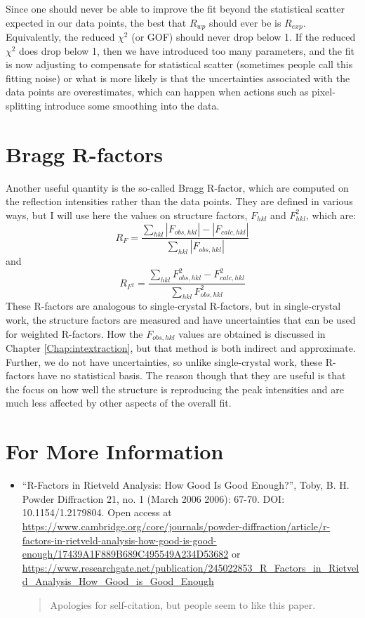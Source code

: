 Since one should never be able to improve the fit beyond the statistical scatter expected in our data points, the best that $R_{wp}$ should ever be is $R_{exp}$. Equivalently, the reduced $\chi^2$ (or GOF) should never drop below 1. If the reduced  $\chi^2$ does drop below 1, then we have introduced too many parameters, and the fit is now adjusting to compensate for statistical scatter (sometimes people call this fitting noise) or what is more likely is that the uncertainties associated with the data points are overestimates, which can happen when actions such as pixel-splitting introduce some smoothing into the data.  

\section{Bragg R-factors}

Another useful quantity  is the so-called Bragg R-factor, which are computed on the reflection intensities rather than the data points. They are defined in various ways, but I will use here the values on structure factors,  $F_{hkl}$ and $F_{hkl}^2$,  which are:
$$R_F  = \frac{\sum_{hkl} |F_{obs, hkl}| - |F_{calc, hkl}| } {\sum_{hkl} |F_{obs, hkl}|} $$
and 
$$R_{F^2}  = \frac{\sum_{hkl} F^2_{obs, hkl} - F^2_{calc, hkl} } {\sum_{hkl} F^2_{obs, hkl}} $$
These R-factors are analogous to single-crystal R-factors, but in single-crystal work, the structure factors are measured and have uncertainties that can be used for weighted R-factors. How the $F_{obs, hkl}$ values are obtained is discussed in Chapter \ref{Chap:intextraction}, but that method is both indirect and approximate. Further, we do not have uncertainties, so unlike single-crystal work, these R-factors have no statistical basis. The reason though that they are useful is that the focus on how well the structure is reproducing the peak intensities and are much less affected by other aspects of the overall fit. 

\section{For More Information}

\begin{itemize}
\item ``R-Factors in Rietveld Analysis: How Good Is Good Enough?'', Toby, B. H. Powder Diffraction 21, no. 1 (March 2006 2006): 67-70. DOI: 10.1154/1.2179804. Open access at \url{https://www.cambridge.org/core/journals/powder-diffraction/article/r-factors-in-rietveld-analysis-how-good-is-good-enough/17439A1F889B689C495549A234D53682} or \url{https://www.researchgate.net/publication/245022853_R_Factors_in_Rietveld_Analysis_How_Good_is_Good_Enough}
\begin{quote}
Apologies for self-citation, but people seem to like this paper.
\end{quote}
\end{itemize}
